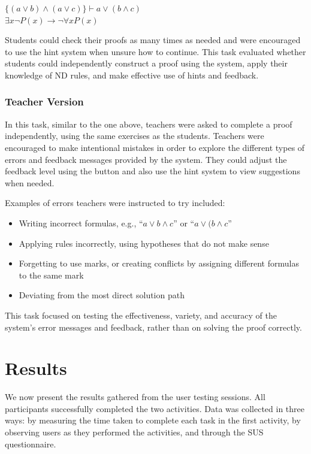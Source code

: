 \begin{center}
$\{(a \lor b) \land (a \lor c)\} \vdash a \lor (b \land c)$ \\
$\exists x \neg P(x) \to \neg \forall x P(x)$
\end{center}

Students could check their proofs as many times as needed and were encouraged to use the hint system when unsure how to continue. This task evaluated whether students could independently construct a proof using the system, apply their knowledge of \gls{ND} rules, and make effective use of hints and feedback.

\subsubsection*{Teacher Version}
In this task, similar to the one above, teachers were asked to complete a proof independently, using the same exercises as the students. Teachers were encouraged to make intentional mistakes in order to explore the different types of errors and feedback messages provided by the system. They could adjust the feedback level using the button and also use the hint system to view suggestions when needed.  

Examples of errors teachers were instructed to try included:
\begin{itemize}
    \item Writing incorrect formulas, e.g., ``$a \lor b \land c$'' or ``$a \lor (b \land c$''  
    \item Applying rules incorrectly, using hypotheses that do not make sense  
    \item Forgetting to use marks, or creating conflicts by assigning different formulas to the same mark  
    \item Deviating from the most direct solution path  
\end{itemize}

This task focused on testing the effectiveness, variety, and accuracy of the system’s error messages and feedback, rather than on solving the proof correctly.

\section{Results}
We now present the results gathered from the user testing sessions. All participants successfully completed the two activities. Data was collected in three ways: by measuring the time taken to complete each task in the first activity, by observing users as they performed the activities, and through the \gls{SUS} questionnaire.  

